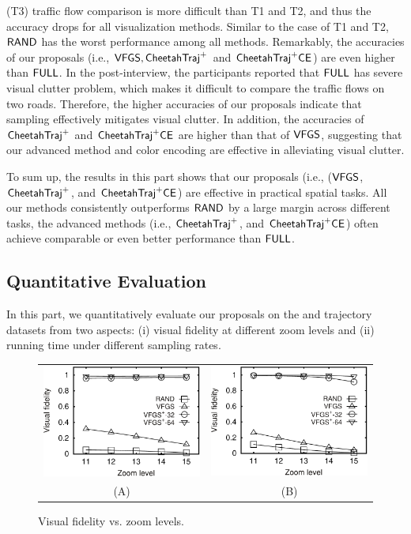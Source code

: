(T3) traffic flow comparison is more difficult than T1 and T2, and thus the accuracy drops for all visualization methods. Similar to the case of T1 and T2, $\mathsf{RAND}$ has the worst performance among all methods. Remarkably, the accuracies of our proposals (i.e.,  $\mathsf{VFGS},\mathsf{CheetahTraj}^{+}$ and $\mathsf{CheetahTraj}^{+}\mathsf{CE}$) are even higher than $\mathsf{FULL}$. In the post-interview, the participants reported that $\mathsf{FULL}$ has severe visual clutter problem, which makes it difficult to compare the traffic flows on two roads. Therefore, the higher accuracies of our proposals indicate that sampling effectively mitigates visual clutter. In addition, the accuracies of $\mathsf{CheetahTraj}^{+}$ and $\mathsf{CheetahTraj}^{+}\mathsf{CE}$ are higher than that of $\mathsf{VFGS}$, suggesting that our advanced method and color encoding are effective in alleviating visual clutter.

To sum up, the results in this part shows that our proposals (i.e., ($\mathsf{VFGS}$, $\mathsf{CheetahTraj}^{+}$, and $\mathsf{CheetahTraj}^{+}\mathsf{CE}$) are effective in practical spatial tasks. All our methods consistently outperforms $\mathsf{RAND}$ by a large margin across different tasks, the advanced methods (i.e., $\mathsf{CheetahTraj}^{+}$, and $\mathsf{CheetahTraj}^{+}\mathsf{CE}$) often achieve comparable or even better performance than  $\mathsf{FULL}$.

\subsection{Quantitative Evaluation}\label{sec:quality}
In this part, we quantitatively evaluate our proposals on the \pt{} and \sz{} trajectory datasets from two aspects:
(i) visual fidelity at different zoom levels
and (ii) running time under different sampling rates.

\begin{figure}
 \centering
 \small
 \begin{tabular}{cc}
   \includegraphics[width=0.44\columnwidth]{pictures/fporto}
   &
   \includegraphics[width=0.44\columnwidth]{pictures/fshenzhen}
   \\
   (A) \pt{}
   &
   (B) \sz{}
 \end{tabular}
 \vspace{-3mm}
 \caption{Visual fidelity vs. zoom levels.}
 \label{fig:fidelity}
 \vspace{-3mm}
\end{figure}

